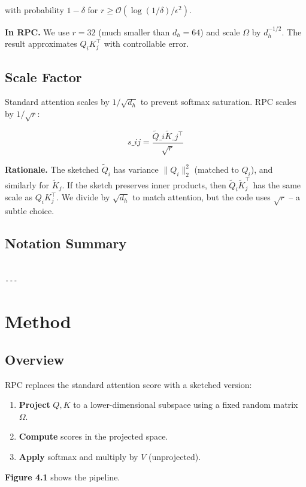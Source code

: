 with probability $1 - \delta$ for $r \geq \mathcal{O}(\log(1/\delta) / \epsilon^2)$.

\textbf{In RPC.} We use $r = 32$ (much smaller than $d_h = 64$) and scale 
$\Omega$ by $d_h^{-1/2}$. The result approximates $Q_i K_j^\top$ with 
controllable error.

\subsection{Scale Factor}

Standard attention scales by $1/\sqrt{d_h}$ to prevent softmax saturation. 
RPC scales by $1/\sqrt{r}$:

\[
s\_{ij} = \frac{\tilde{Q}\_i \tilde{K}\_j^\top}{\sqrt{r}}
\tag{3.6}
\]

\textbf{Rationale.} The sketched $\tilde{Q}_i$ has variance $\|Q_i\|_2^2$ 
(matched to $Q_i$), and similarly for $\tilde{K}_j$. If the sketch preserves 
inner products, then $\tilde{Q}_i \tilde{K}_j^\top$ has the same scale as 
$Q_i K_j^\top$. We divide by $\sqrt{d_h}$ to match attention, but the code 
uses $\sqrt{r}$ -- a subtle choice.

\subsection{Notation Summary}

\begin{lstlisting}

---
\end{lstlisting}


\section{Method}

\subsection{Overview}

RPC replaces the standard attention score with a sketched version:

\begin{enumerate}
\item \textbf{Project} $Q, K$ to a lower-dimensional subspace using a fixed random
  matrix $\Omega$.
\item \textbf{Compute} scores in the projected space.
\item \textbf{Apply} softmax and multiply by $V$ (unprojected).

\end{enumerate}
\textbf{Figure 4.1} shows the pipeline.

